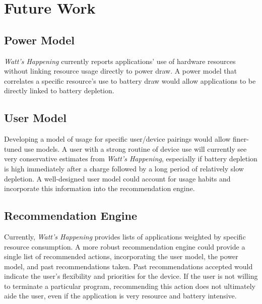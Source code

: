 \section{Future Work}
\label{sec:future}
\subsection{Power Model}
\emph{Watt's Happening} currently reports applications' use of hardware resources without linking resource usage directly to power draw.
A power model that correlates a specific resource's use to battery draw would allow applications to be directly linked to battery depletion.

\subsection{User Model}
Developing a model of usage for specific user/device pairings would allow finer-tuned use models.
A user with a strong routine of device use will currently see very conservative estimates from \emph{Watt's Happening}, especially if battery depletion is high immediately after a charge followed by a long period of relatively slow depletion. 
A well-designed user model could account for usage habits and incorporate this information into the recommendation engine.

\subsection{Recommendation Engine}
Currently, \emph{Watt's Happening} provides lists of applications weighted by specific resource consumption.
A more robust recommendation engine could provide a single list of recommended actions, incorporating the user model, the power model, and past recommendations taken.
Past recommendations accepted would indicate the user's flexibility and priorities for the device.
If the user is not willing to terminate a particular program, recommending this action does not ultimately aide the user, even if the application is very resource and battery intensive.


